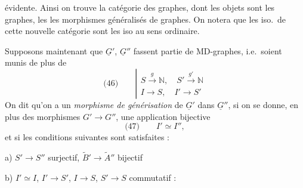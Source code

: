 \documentclass[11pt,a4paper]{article}
\begin{document}
évidente. Ainsi on trouve la catégorie \struck{\ill{}} des graphes, dont les objets sont les graphes, les   les morphismes généralisés de graphes. On notera que les iso.\ de cette nouvelle catégorie sont les iso au sens ordinaire.

Supposons maintenant que  $\underline{G}'$, $\underline{G}''$ fassent partie de MD-graphes, i.e.\ soient munis de plus de \struck{\ill{}}
\[
\text{(46)}\qquad
\left|
\begin{array}{l}
S \xrightarrow{g} \mathbb{N}, \quad S' \xrightarrow{g'} \mathbb{N} \\
I \to S, \quad I' \to S'
\end{array}
\right.
\]
On dit qu'on a un \emph{morphisme de générisation} de $\underline{G}'$ dans $\underline{G}''$, si on se donne, en plus des morphismes  $G' \to G''$, une application bijective
\[
\text{(47)}\qquad I' \simeq I'' ,
\]
 et si les conditions suivantes sont satisfaites :

a) $S' \to S''$ surjectif, $\tilde{B}' \to \tilde{A}''$ bijectif

b) $I' \simeq I$, $I' \to S'$, $I \to S$, $S' \to S$ commutatif :


\end{document}
